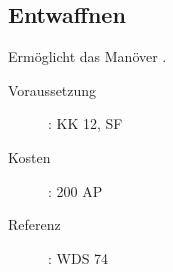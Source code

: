 \subsection{Entwaffnen}
\label{sf.entwaffnen}
Ermöglicht das Manöver .
\begin{description}
    \item[Voraussetzung]:
        KK 12, SF 
    \item [Kosten]:
        200 AP
    \item [Referenz]:
        WDS 74
\end{description}
